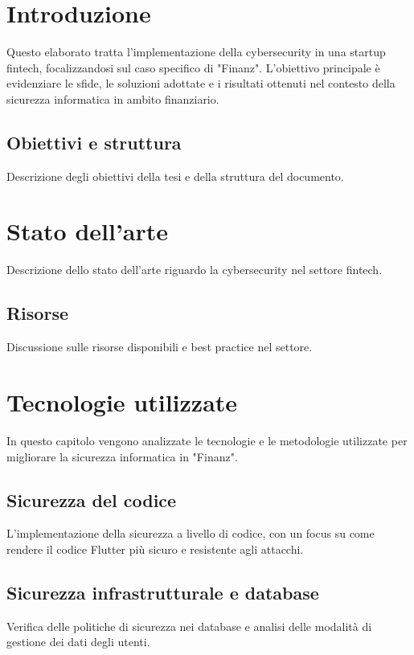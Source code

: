 \documentclass[a4paper,12pt]{book}
\begin{document}
\tableofcontents
\newpage

\chapter{Introduzione}
Questo elaborato tratta l'implementazione della cybersecurity in una startup fintech, focalizzandosi sul caso specifico di "Finanz". L'obiettivo principale è evidenziare le sfide, le soluzioni adottate e i risultati ottenuti nel contesto della sicurezza informatica in ambito finanziario.

\section{Obiettivi e struttura}
Descrizione degli obiettivi della tesi e della struttura del documento.

\chapter{Stato dell'arte}
Descrizione dello stato dell'arte riguardo la cybersecurity nel settore fintech.

\section{Risorse}
Discussione sulle risorse disponibili e best practice nel settore.

\chapter{Tecnologie utilizzate}
In questo capitolo vengono analizzate le tecnologie e le metodologie utilizzate per migliorare la sicurezza informatica in "Finanz". 

\section{Sicurezza del codice}
L'implementazione della sicurezza a livello di codice, con un focus su come rendere il codice Flutter più sicuro e resistente agli attacchi.

\section{Sicurezza infrastrutturale e database}
Verifica delle politiche di sicurezza nei database e analisi delle modalità di gestione dei dati degli utenti.
\end{document}
